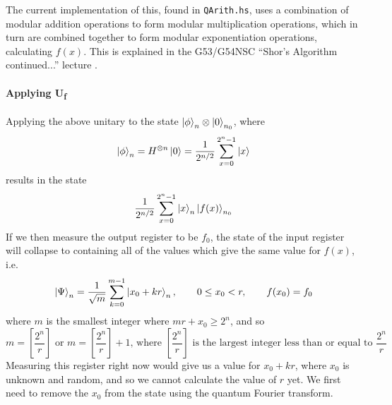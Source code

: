 \documentclass[a4paper,10pt, titlepage, twoside]{article}
\begin{document}
The current implementation of this, found in \texttt{QArith.hs}, uses a combination of modular addition operations to form modular multiplication operations, which in turn are combined together to form modular exponentiation operations, calculating $f(x)$. This is explained in the G53/G54NSC ``Shor's Algorithm continued...'' lecture \cite{nsc}. 

\paragraph{Applying U\textsubscript{f}}
Applying the above unitary to the state $\ket \phi _n \otimes \ket 0 _{n_0}$, where 
$$\ket \phi _n =H^{\otimes n} \ket 0 = \frac{1}{2^{n/2}} \sum_{x=0}^{2^n -1} \ket x$$
results in the state
$$\frac{1}{2^{n/2}} \sum_{x=0}^{2^n -1} \ket x _n \ket{f(x)}_{n_0}$$
If we then measure the output register to be $f_0$, the state of the input register will collapse to containing all of the values which give the same value for $f(x)$, i.e.
$$\ket \Psi _n = \frac{1}{\sqrt m} \sum _{k=0}^{m-1} \ket{x_0 + kr}_n, \qquad  0 \leq x_0 < r, \qquad f(x_0) = f_0 $$ where $m$ is the smallest integer where $mr + x_0 \geq 2^n$, and so
$$m = \left[ \frac{2^n}{r} \right] \text{ or } m = \left[ \frac{2^n}{r} \right] + 1 \text{, where $\left[ \frac{2^n}{r} \right]$ is the largest integer less than or equal to $\frac{2^n}{r}$} $$
Measuring this register right now would give us a value for $x_0 + kr$, where $x_0$ is unknown and random, and so we cannot calculate the value of $r$ yet. We first need to remove the $x_0$ from the state using the quantum Fourier transform.
\end{document}
